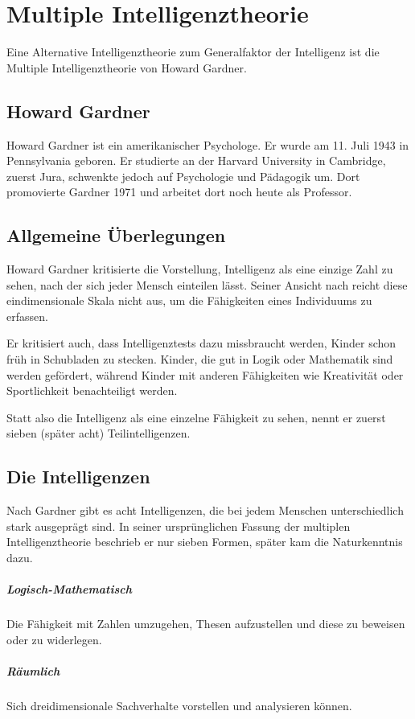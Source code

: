 \chapter{Multiple Intelligenztheorie}
Eine Alternative Intelligenztheorie zum Generalfaktor der Intelligenz ist die Multiple Intelligenztheorie von Howard Gardner.

\section{Howard Gardner}
Howard Gardner ist ein amerikanischer Psychologe. Er wurde am 11. Juli 1943 in Pennsylvania geboren. Er studierte an der Harvard University in Cambridge, zuerst Jura, schwenkte jedoch auf Psychologie und Pädagogik um. Dort promovierte Gardner 1971 und arbeitet dort noch heute als Professor.

\section{Allgemeine Überlegungen}
Howard Gardner kritisierte die Vorstellung, Intelligenz als eine einzige Zahl zu sehen, nach der sich jeder Mensch einteilen lässt. Seiner Ansicht nach reicht diese eindimensionale Skala nicht aus, um die Fähigkeiten eines Individuums zu erfassen.

Er kritisiert auch, dass Intelligenztests dazu missbraucht werden, Kinder schon früh in \glqq Schubladen zu stecken\grqq{}. Kinder, die gut in Logik oder Mathematik sind werden gefördert, während Kinder mit anderen Fähigkeiten wie Kreativität oder Sportlichkeit benachteiligt werden.

Statt also die Intelligenz als eine einzelne Fähigkeit zu sehen, nennt er zuerst sieben (später acht) Teilintelligenzen.

\section{Die Intelligenzen}
Nach Gardner gibt es acht Intelligenzen, die bei jedem Menschen unterschiedlich stark ausgeprägt sind. In seiner ursprünglichen Fassung der multiplen Intelligenztheorie beschrieb er nur sieben Formen, später kam die Naturkenntnis dazu.
\paragraph{Logisch-Mathematisch}
Die Fähigkeit mit Zahlen umzugehen, Thesen aufzustellen und diese zu beweisen oder zu widerlegen.
\paragraph{Räumlich}
Sich dreidimensionale Sachverhalte vorstellen und analysieren können.
